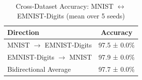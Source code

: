 
\begin{table}[h]
\centering
\caption{Cross-Dataset Accuracy: MNIST $\leftrightarrow$ EMNIST-Digits (mean over 5 seeds)}
\label{tab:extension2_mnist_emnist_digits}
\begin{tabular}{lc}
\toprule
\textbf{Direction} & \textbf{Accuracy} \\
\midrule
MNIST $\rightarrow$ EMNIST-Digits & 97.5 ± 0.0\% \\
EMNIST-Digits $\rightarrow$ MNIST & 97.9 ± 0.0\% \\
\midrule
Bidirectional Average & 97.7 ± 0.0\% \\
\bottomrule
\end{tabular}
\end{table}
